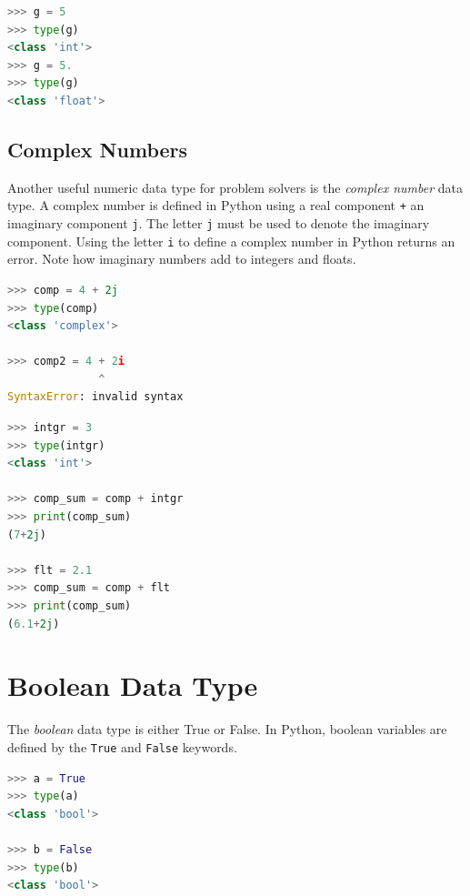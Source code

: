 \documentclass{book}
\begin{document}
\begin{lstlisting}[language=Python]
>>> g = 5
>>> type(g)
<class 'int'>
>>> g = 5.
>>> type(g)
<class 'float'>
\end{lstlisting}
    




    
        \subsection{Complex Numbers}\label{complex-numbers}

Another useful numeric data type for problem solvers is the
\emph{complex number} data type. A complex number is defined in Python
using a real component \lstinline!+! an imaginary component
\lstinline!j!. The letter \lstinline!j! must be used to denote the
imaginary component. Using the letter \lstinline!i! to define a complex
number in Python returns an error. Note how imaginary numbers add to
integers and floats.

\begin{lstlisting}[language=Python]
>>> comp = 4 + 2j
>>> type(comp)
<class 'complex'>

>>> comp2 = 4 + 2i
              ^
SyntaxError: invalid syntax
\end{lstlisting}

\begin{lstlisting}[language=Python]
>>> intgr = 3
>>> type(intgr)
<class 'int'>

>>> comp_sum = comp + intgr
>>> print(comp_sum)
(7+2j)

>>> flt = 2.1
>>> comp_sum = comp + flt
>>> print(comp_sum)
(6.1+2j)
\end{lstlisting}
    




    
        \section{Boolean Data Type}\label{boolean-data-type}
    




    
        The \emph{boolean} data type is either True or False. In Python, boolean
variables are defined by the \lstinline!True! and \lstinline!False!
keywords.

\begin{lstlisting}[language=Python]
>>> a = True
>>> type(a)
<class 'bool'>

>>> b = False
>>> type(b)
<class 'bool'>
\end{lstlisting}
\end{document}
